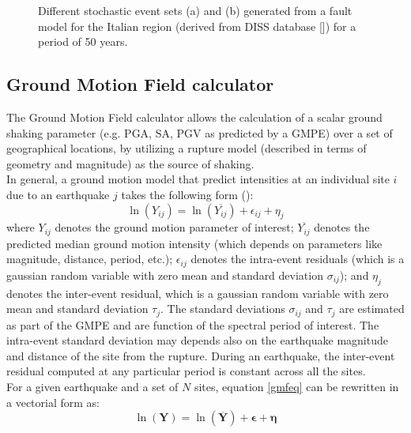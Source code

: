 \begin{figure}[!htbp]
\begin{center}
\caption{Different stochastic event sets (a) and (b) generated from a fault model for the Italian region (derived from DISS database [\cite{basili2008}]) for a period of 50 years.}
\label{ses_italy}
\end{center}
\end{figure}
%
\subsection{Ground Motion Field calculator}
The Ground Motion Field calculator allows the calculation of a scalar ground shaking parameter (e.g. PGA, SA, PGV as predicted by a GMPE) over a set of geographical locations, by utilizing a rupture model (described in terms of geometry and magnitude) as the source of shaking.\\
In general, a ground motion model that predict intensities at an individual site $i$ due to an earthquake $j$ takes the following form (\cite{jayaram2009}):
\begin{equation}
\ln (Y_{ij}) = \ln (\overline{Y_{ij}})+\epsilon_{ij}+\eta_{j}
\label{gmfeq}
\end{equation}
where $Y_{ij}$ denotes the ground motion parameter of interest; $\overline{Y_{ij}}$ denotes the predicted median ground motion intensity (which depends on parameters like magnitude, distance, period, etc.); $\epsilon_{ij}$ denotes the intra-event residuals (which is a gaussian random variable with zero mean and standard deviation $\sigma_{ij}$); and $\eta_{j}$ denotes the inter-event residual, which is a gaussian random variable with zero mean and standard deviation $\tau_{j}$. The standard deviations $\sigma_{ij}$ and $\tau_{j}$ are estimated as part of the GMPE and are function of the spectral period of interest. The intra-event standard deviation may depends also on the earthquake magnitude and distance of the site from the rupture. During an earthquake, the inter-event residual computed at any particular period is constant across all the sites.\\
For a given earthquake and a set of $N$ sites, equation \ref{gmfeq} can be rewritten in a vectorial form as:
\begin{equation}
\ln (\bm{Y}) = \ln (\overline{\bm{Y}})+\bm{\epsilon}+\bm{\eta} 
\label{gmfeqvec}
\end{equation}
